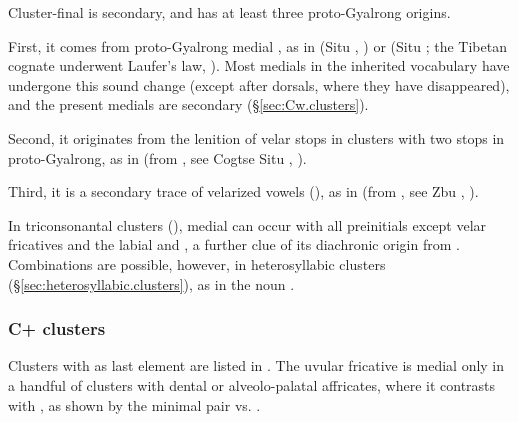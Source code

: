 Cluster-final  is secondary, and has at least three proto-Gyalrong origins. 


First, it comes from proto-Gyalrong medial ,  as in  (Situ , \citealt{huangsun02}) or  (Situ ; the Tibetan cognate  underwent Laufer's law, \citealt{jacques09wazur, hill11laws}). Most  medials in the inherited vocabulary have undergone this sound change (except after dorsals, where they have disappeared), and the present  medials are secondary (§\ref{sec:Cw.clusters}).  

Second, it originates from the lenition of velar stops in clusters with two stops in proto-Gyalrong, as in  (from , see Cogtse Situ , \citealt{huangsun02}).

Third, it is a secondary trace of velarized vowels (\citealt[231]{jacques04these}), as in  (from , see Zbu , \citealt[13]{gong18these}).

In triconsonantal clusters (),  medial  can occur with all preinitials except velar fricatives and the labial  and , a further clue of its diachronic origin from . Combinations  are possible, however, in heterosyllabic clusters (§\ref{sec:heterosyllabic.clusters}), as in the noun .

\subsubsection{C+ clusters} \label{sec:CRR.clusters}
Clusters with  as last element are listed in . The uvular fricative is medial only in a handful of clusters with dental or alveolo-palatal affricates, where it contrasts with , as shown by the minimal pair  vs. .

